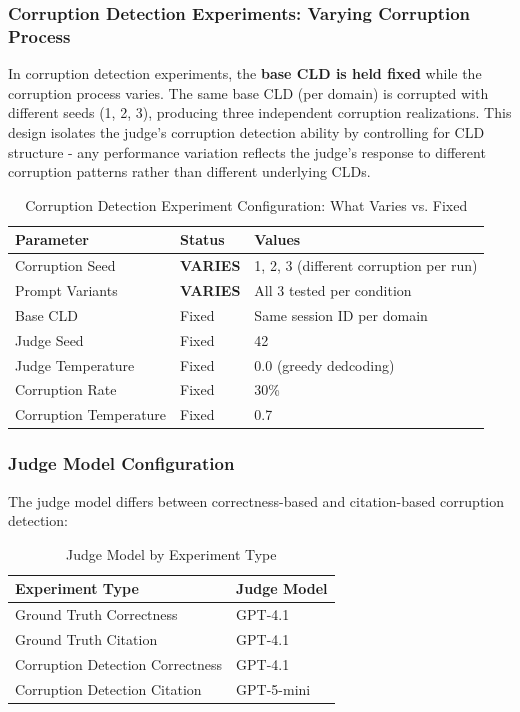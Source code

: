 \documentclass{article}
\begin{document}
\subsubsection{Corruption Detection Experiments: Varying Corruption Process}

In corruption detection experiments, the \textbf{base CLD is held fixed} while the corruption process varies. The same base CLD (per domain) is corrupted with different seeds (1, 2, 3), producing three independent corruption realizations. This design isolates the judge's corruption detection ability by controlling for CLD structure - any performance variation reflects the judge's response to different corruption patterns rather than different underlying CLDs.

\begin{table}[H]
\centering
\caption{Corruption Detection Experiment Configuration: What Varies vs. Fixed}
\label{tab:corruption_config}
\begin{tabular}{lll}
\toprule
\textbf{Parameter} & \textbf{Status} & \textbf{Values} \\
\midrule
Corruption Seed & \textbf{VARIES} & 1, 2, 3 (different corruption per run) \\
Prompt Variants & \textbf{VARIES} & All 3 tested per condition \\
\midrule
Base CLD & Fixed & Same session ID per domain \\
Judge Seed & Fixed & 42 \\
Judge Temperature & Fixed & 0.0 (greedy dedcoding) \\
Corruption Rate & Fixed & 30\% \\
Corruption Temperature & Fixed & 0.7 \\
\bottomrule
\end{tabular}
\end{table}

\subsubsection{Judge Model Configuration}

The judge model differs between correctness-based and citation-based corruption detection:

\begin{table}[H]
\centering
\caption{Judge Model by Experiment Type}
\label{tab:judge_models}
\begin{tabular}{ll}
\toprule
\textbf{Experiment Type} & \textbf{Judge Model} \\
\midrule
Ground Truth Correctness & GPT-4.1 \\
Ground Truth Citation & GPT-4.1 \\
Corruption Detection Correctness & GPT-4.1 \\
Corruption Detection Citation & GPT-5-mini \\
\bottomrule
\end{tabular}
\end{table}
\end{document}
